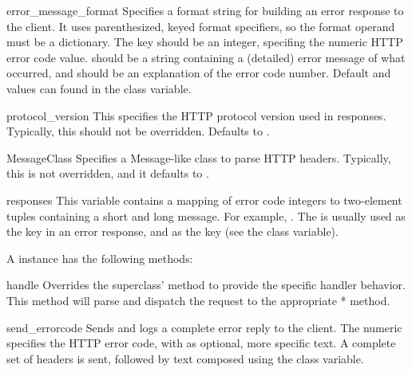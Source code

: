 \begin{datadesc}{error_message_format}
Specifies a format string for building an error response to the
client. It uses parenthesized, keyed format specifiers, so the
format operand must be a dictionary. The  key should
be an integer, specifing the numeric HTTP error code value.
 should be a string containing a (detailed) error
message of what occurred, and  should be an
explanation of the error code number. Default 
and  values can found in the 
class variable.
\end{datadesc}

\begin{datadesc}{protocol_version}
This specifies the HTTP protocol version used in responses.
Typically, this should not be overridden. Defaults to
.
\end{datadesc}

\begin{datadesc}{MessageClass}
Specifies a Message-like class to parse HTTP headers. Typically,
this is not overridden, and it defaults to .
\end{datadesc}

\begin{datadesc}{responses}
This variable contains a mapping of error code integers to two-element
tuples containing a short and long message. For example,
. The
 is usually used as the  key in an
error response, and  as the  key
(see the  class variable).
\end{datadesc}

\renewcommand{\indexsubitem}{(BaseHTTPRequestHandler method)}

A  instance has the following methods:

\begin{funcdesc}{handle}{}
Overrides the superclass'  method to provide the
specific handler behavior. This method will parse and dispatch
the request to the appropriate * method.
\end{funcdesc}

\begin{funcdesc}{send_error}{code}
Sends and logs a complete error reply to the client. The numeric
 specifies the HTTP error code, with  as
optional, more specific text. A complete set of headers is sent,
followed by text composed using the 
class variable.
\end{funcdesc}

